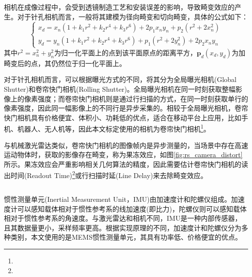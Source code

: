 相机在成像过程中，会受到透镜制造工艺和安装误差的影响，导致畸变效应的产生。对于针孔相机而言，一般将其建模为径向畸变和切向畸变\cite{高翔2017视觉}，具体的公式如下：
\begin{equation}
  \label{equ:cam_pinhole_dist}
  \begin{cases}
    x_d=x_n(1+k_1r^2+k_2r^4+k_3r^6)+2p_1x_ny_n+p_2(r^2+2x_n^2) \\
    y_d=y_n(1+k_1r^2+k_2r^4+k_3r^6)+p_1(r^2+2y_n^2)+2p_2x_ny_n
  \end{cases}
\end{equation}
其中$r^2=x_n^2+y_n^2$为归一化平面上的点到该平面原点的距离平方，$\boldsymbol{p}_d\left( x_d,y_d	\right) $为加畸变后的点，其仍然位于归一化平面上。

对于针孔相机而言，可以根据曝光方式的不同，将其分为全局曝光相机(Global Shutter)和卷帘快门相机(Rolling Shutter)。全局曝光相机在同一时刻获取整幅影像上的像素强度；而卷帘快门相机则是通过行扫描的方式，在同一时刻获取单行的像素强度，因此同一幅影像上的不同行是异步采集的。相较于全局曝光相机，卷帘快门相机具有价格便宜、体积小、功耗低的优点，适合在移动平台上应用，比如手机、机器人、无人机等，因此本文标定使用的相机为卷帘快门相机\footnote{}。

与机械激光雷达类似，卷帘快门相机的图像帧内是异步测量的，当场景中存在高速运动物体时，获取的影像存在畸变，称为果冻效应，如图\ref{fig:rs_camera_distort}所示。果冻效应会严重影响相关几何算法的精度，因此需要估计卷帘快门相机的读出时间(Readout Time)\footnote{}或行扫描时延(Line Delay)来去除畸变效应。


\subsection{}
惯性测量单元(Inertial Measurement Unit，IMU)由加速度计和陀螺仪组成。加速度计可以感知载体相对于惯性参考系的线加速度(即比力)，陀螺仪则可以感知载体相对于惯性参考系的角速度。与激光雷达和相机不同，IMU是一种内部传感器，且其数据量更小，采样频率更高。根据实现原理的不同，加速度计和陀螺仪分为多种类别，本文使用的是MEMS惯性测量单元，其具有功率低、价格便宜的优点。


